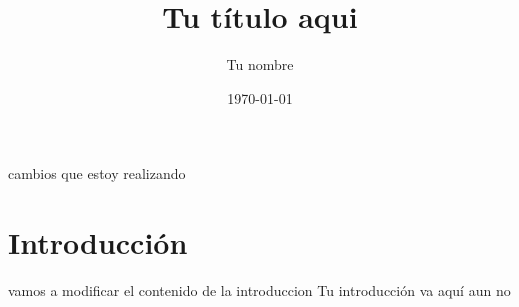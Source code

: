 \documentclass{article}
\title{Tu título aqui}
\author{Tu nombre}
\date{\today}
\begin{document}
\maketitle
cambios que estoy realizando
\section{Introducción}
vamos a modificar el contenido de la introduccion
Tu introducción va aquí
aun no
\end{document}
